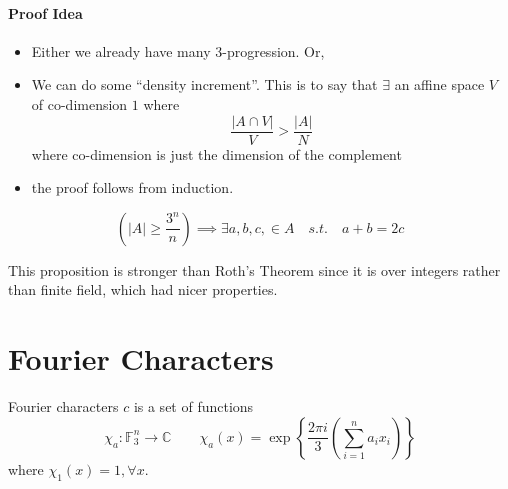 \paragraph{Proof Idea}
\begin{itemize}
	\item Either we already have many 3-progression. Or,
	\item We can do some ``density increment''. This is to say that $\exists$ an affine space $V$ of co-dimension $1$ where 
		\begin{equation}
			\frac{|A \cap V|}{V} > \frac{|A|}{N}
		\end{equation}
	where co-dimension is just the dimension of the complement
	\item the proof follows from induction. 
\end{itemize}

\begin{proposition}
	\begin{equation}
		\left( |A| \geq \frac{3^n}{n} \right) \implies \exists a, b, c, \in A \quad s.t. \quad a + b = 2c
	\end{equation}
	\label{prop:strong-roth}
\end{proposition}
This proposition is stronger than Roth's Theorem since it is over integers rather than finite field, which had nicer properties. 

\section{Fourier Characters}
Fourier characters $c$ is a set of functions
\begin{equation}
	\chi_a: \mathbb F_3^n \rightarrow \mathbb C \quad \quad \chi_a (x) = \exp \left\{ 
		\frac{2\pi i}{3} \left( \sum_{i = 1}^n a_i x_i \right)
	\right\}
\end{equation}
where $\chi_1(x) = 1, \forall x$. 


